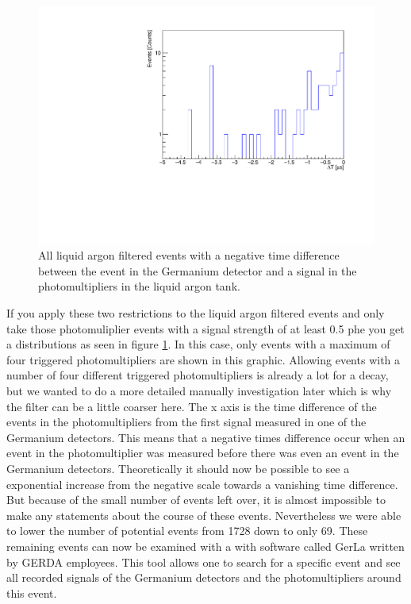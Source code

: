 \begin{figure}[ht!]
	\centering
	\ifmakefigures%
	\includegraphics[width=130mm]{./Bilder/TriggerTimeOnly4.pdf}
	\fi%
	\caption{\label{fig:Trigger4}
		All liquid argon filtered events with a negative time difference between the event in the Germanium detector and a signal in the photomultipliers in the liquid argon tank.
	}
\end{figure}

If you apply these two restrictions to the liquid argon filtered events and only take those photomuliplier events with a signal strength of at least 0.5 phe you get a distributions as seen in figure \ref{fig:Trigger4}.
In this case, only events with a maximum of four triggered photomultipliers are shown in this graphic.
Allowing events with a number of four different triggered photomultipliers is already a lot for a  decay, but we wanted to do a more detailed manually investigation later which is why the filter can be a little coarser here.
The x axis is the time difference of the events in the photomultipliers from the first signal measured in one of the Germanium detectors.
This means that a negative times difference occur when an event in the photomultiplier was measured before there was even an event in the Germanium detectors.
Theoretically it should now be possible to see a exponential increase from the negative scale towards a vanishing time difference.
\\

But because of the small number of events left over, it is almost impossible to make any statements about the course of these events.
Nevertheless we were able to lower the number of potential  events from 1728 down to only 69.  
These remaining events can now be examined with a with software called GerLa written by GERDA employees.
This tool allows one to search for a specific event and see all recorded signals of the Germanium detectors and the photomultipliers around this event.
\\

